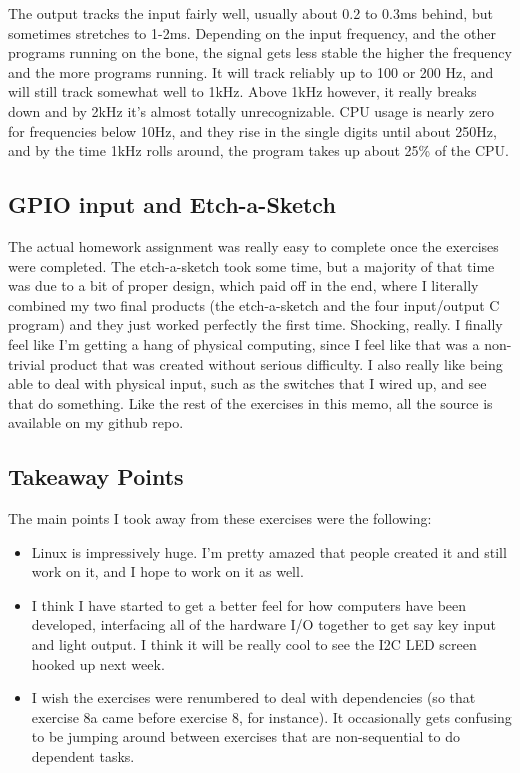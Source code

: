 \documentclass[letterpaper,10pt]{texMemo}
\begin{document}
%
\noindent The output tracks the input fairly well, usually about 0.2 to 0.3ms
behind, but sometimes stretches to 1-2ms. Depending on the input frequency, and
the other programs running on the bone, the signal gets less stable the higher
the frequency and the more programs running. It will track reliably up to 100
or 200 Hz, and will still track somewhat well to 1kHz. Above 1kHz however, it
really breaks down and by 2kHz it's almost totally unrecognizable. CPU usage is
nearly zero for frequencies below 10Hz, and they rise in the single digits
until about 250Hz, and by the time 1kHz rolls around, the program takes up
about 25\% of the CPU.

\subsection{GPIO input and Etch-a-Sketch}
\noindent The actual homework assignment was really easy to complete once the
exercises were completed. The etch-a-sketch took some time, but a majority of
that time was due to a bit of proper design, which paid off in the end, where I
literally combined my two final products (the etch-a-sketch and the four
input/output C program) and they just worked perfectly the first time.
Shocking, really. I finally feel like I'm getting a hang of physical computing,
since I feel like that was a non-trivial product that was created without
serious difficulty. I also really like being able to deal with physical input,
such as the switches that I wired up, and see that do something. Like the rest
of the exercises in this memo, all the source is available on my github repo. \\


\subsection{Takeaway Points}
\noindent The main points I took away from these exercises were the following:
\begin{itemize}
  \item Linux is impressively huge. I'm pretty amazed that people created it and
still work on it, and I hope to work on it as well.
  \item I think I have started to get a better feel for how computers have been
developed, interfacing all of the hardware I/O together to get say key input
and light output. I think it will be really cool to see the I2C LED screen
hooked up next week.
  \item I wish the exercises were renumbered to deal with dependencies (so that
exercise 8a came before exercise 8, for instance). It occasionally gets
confusing to be jumping around between exercises that are non-sequential to do
dependent tasks.
\end{itemize}
\end{document}
